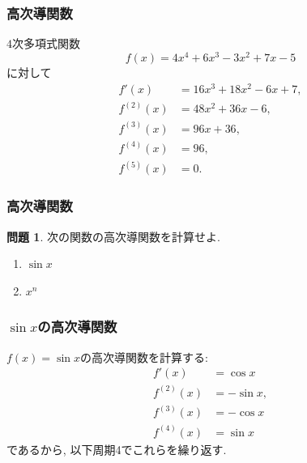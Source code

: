 \documentclass[dvipdfmx,cjk,10.2pt]{beamer}
\theoremstyle{definition}
\newtheorem{Prob}[Thm]{問題}
\begin{document}





\begin{frame}
\frametitle{高次導関数}


$4$次多項式関数
$$
f(x)= 4x^4+6x^3-3x^2+7x-5
$$
に対して
\begin{align*}
f'(x) & = 16x^3+18x^2-6x+7, \\
f^{(2)}(x) & = 48x^2+36x-6, \\
f^{(3)}(x) & = 96x+36, \\
f^{(4)}(x) & = 96, \\
f^{(5)}(x) & = 0. 
\end{align*}


\end{frame}







\begin{frame}
\frametitle{高次導関数}

\begin{Prob}
次の関数の高次導関数を計算せよ. 
\begin{enumerate}
\item $\sin x$
\item $x^n$
\end{enumerate}
\end{Prob}


\end{frame}







\begin{frame}
\frametitle{$\sin x$の高次導関数}


$f(x)=\sin x$の高次導関数を計算する: 
\begin{align*}
f'(x) & = \cos x \\
f^{(2)}(x) & = -\sin x, \\
f^{(3)}(x) & = -\cos x \\
f^{(4)}(x) & =  \sin x
\end{align*}
であるから, 以下周期4でこれらを繰り返す. 
\end{frame}
\end{document}
